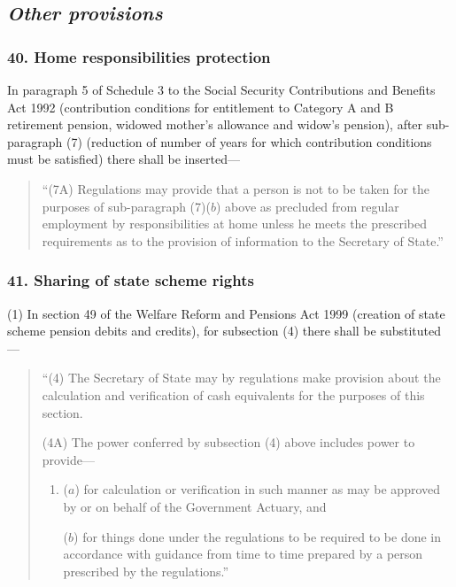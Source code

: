 \documentclass[12pt,a4paper]{article}
\begin{document}
\subsection{\itshape Other provisions}

\subsubsection{40. Home responsibilities protection}

In paragraph 5 of Schedule 3 to the Social Security Contributions and Benefits Act 1992 (contribution conditions for entitlement to Category A and B retirement pension, widowed mother’s allowance and widow’s pension), after sub-paragraph (7)  (reduction of number of years for which contribution conditions must be satisfied) there shall be inserted—
\begin{quotation}
“(7A) Regulations may provide that a person is not to be taken for the purposes of sub-paragraph (7)($b$)  above as precluded from regular employment by responsibilities at home unless he meets the prescribed requirements as to the provision of information to the Secretary of State.”
\end{quotation}

\subsubsection{41. Sharing of state scheme rights}

(1) In section 49 of the Welfare Reform and Pensions Act 1999 (creation of state scheme pension debits and credits), for subsection (4)  there shall be substituted—
\begin{quotation}
“(4) The Secretary of State may by regulations make provision about the calculation and verification of cash equivalents for the purposes of this section.

(4A) The power conferred by subsection (4)  above includes power to provide—
\begin{enumerate}\item[]
($a$) for calculation or verification in such manner as may be approved by or on behalf of the Government Actuary, and

($b$) for things done under the regulations to be required to be done in accordance with guidance from time to time prepared by a person prescribed by the regulations.”
\end{enumerate}
\end{quotation}
\end{document}

